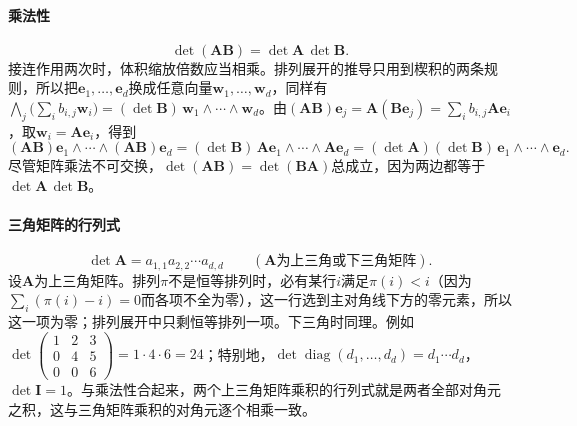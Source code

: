 \paragraph{乘法性}
\[
 \det(\bm A\bm B)=\det\bm A\,\det\bm B.
\]
接连作用两次时，体积缩放倍数应当相乘。排列展开的推导只用到楔积的两条规则，所以把$\bm e_1,\ldots,\bm e_d$换成任意向量$\bm w_1,\ldots,\bm w_d$，同样有$\bigwedge_j\bigl(\sum_ib_{i,j}\bm w_i\bigr)=(\det\bm B)\,\bm w_1\wedge\cdots\wedge\bm w_d$。由$(\bm A\bm B)\bm e_j=\bm A(\bm B\bm e_j)=\sum_i b_{i,j}\bm A\bm e_i$，取$\bm w_i=\bm A\bm e_i$，得到
\[
 (\bm A\bm B)\bm e_1\wedge\cdots\wedge(\bm A\bm B)\bm e_d
 =(\det\bm B)\,\bm A\bm e_1\wedge\cdots\wedge\bm A\bm e_d
 =(\det\bm A)(\det\bm B)\,\bm e_1\wedge\cdots\wedge\bm e_d.
\]
尽管矩阵乘法不可交换，$\det(\bm A\bm B)=\det(\bm B\bm A)$总成立，因为两边都等于$\det\bm A\,\det\bm B$。

\paragraph{三角矩阵的行列式}
\[
 \det\bm A=a_{1,1}a_{2,2}\cdots a_{d,d}\qquad(\bm A\text{为上三角或下三角矩阵}).
\]
设$\bm A$为上三角矩阵。排列$\pi$不是恒等排列时，必有某行$i$满足$\pi(i)<i$（因为$\sum_i(\pi(i)-i)=0$而各项不全为零），这一行选到主对角线下方的零元素，所以这一项为零；排列展开中只剩恒等排列一项。下三角时同理。例如$\det\left(\begin{smallmatrix}1&2&3\\0&4&5\\0&0&6\end{smallmatrix}\right)=1\cdot4\cdot6=24$；特别地，$\det\operatorname{diag}(d_1,\ldots,d_d)=d_1\cdots d_d$，$\det\bm I=1$。与乘法性合起来，两个上三角矩阵乘积的行列式就是两者全部对角元之积，这与三角矩阵乘积的对角元逐个相乘一致。

